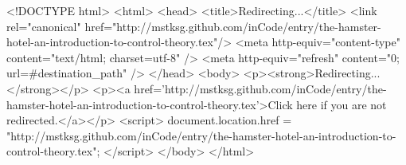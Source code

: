 <!DOCTYPE html>
<html>
<head>
<title>Redirecting...</title>
<link rel="canonical" href="http://mstksg.github.com/inCode/entry/the-hamster-hotel-an-introduction-to-control-theory.tex"/>
<meta http-equiv="content-type" content="text/html; charset=utf-8" />
<meta http-equiv="refresh" content="0; url=#{destination_path}" />
</head>
<body>
  <p><strong>Redirecting...</strong></p>
  <p><a href='http://mstksg.github.com/inCode/entry/the-hamster-hotel-an-introduction-to-control-theory.tex'>Click here if you are not redirected.</a></p>
  <script>
    document.location.href = "http://mstksg.github.com/inCode/entry/the-hamster-hotel-an-introduction-to-control-theory.tex";
  </script>
</body>
</html>
